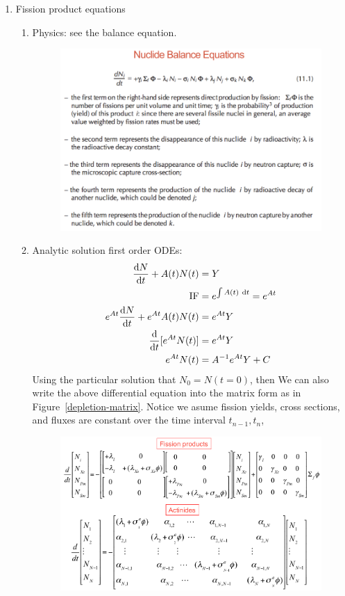\documentclass{school-22.211-notes}
\begin{document}
\begin{enumerate}
\item Fission product equations
  \begin{enumerate}
  \item Physics: see the balance equation. 
    \begin{figure}[ht]
      \centering
      \includegraphics[width=4in]{images/dfs/nuclide-balance-equation.png}
    \end{figure}

  \item Analytic solution first order ODEs: 
    \begin{align}
      \frac{\mathrm{d}N}{\mathrm{d}t} + A(t) N(t) &= Y \\
      \mbox{IF} &= e^{\int A(t) \mbox{ }\mathrm{d} t} = e^{At} \\
      e^{At} \frac{\mathrm{d}N}{\mathrm{d}t} + e^{At} A(t) N(t) &= e^{At} Y \\
      \frac{\mathrm{d}}{\mathrm{d}t}[e^{At} N(t) ] &= e^{At} Y \\
      e^{At} N(t) &= A^{-1} e^{At} Y + C 
    \end{align}
    Using the particular solution that $N_0 = N(t=0)$, then 
    We can also write the above differential equation into the matrix form as in Figure~\ref{depletion-matrix}. Notice we asume fission yields, cross sections, and fluxes are constant over the time interval $t_{n-1}, t_n$,
    \begin{figure}[ht]
      \centering
      \includegraphics[width=5in]{images/dfs/fp-an-matrix-form.png} 
    \end{figure}
  \end{enumerate}


\end{enumerate}
\end{document}
